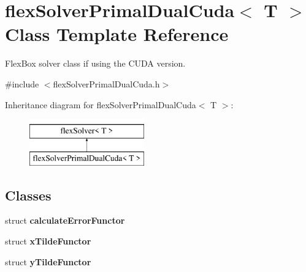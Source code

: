 \hypertarget{classflex_solver_primal_dual_cuda}{}\section{flex\+Solver\+Primal\+Dual\+Cuda$<$ T $>$ Class Template Reference}
\label{classflex_solver_primal_dual_cuda}


Flex\+Box solver class if using the C\+U\+DA version.  




{\ttfamily \#include $<$flex\+Solver\+Primal\+Dual\+Cuda.\+h$>$}

Inheritance diagram for flex\+Solver\+Primal\+Dual\+Cuda$<$ T $>$\+:\begin{figure}[H]
\begin{center}
\leavevmode
\includegraphics[height=2.000000cm]{classflex_solver_primal_dual_cuda}
\end{center}
\end{figure}
\subsection*{Classes}
\begin{DoxyCompactItemize}
\item 
struct {\bfseries calculate\+Error\+Functor}
\item 
struct {\bfseries x\+Tilde\+Functor}
\item 
struct {\bfseries y\+Tilde\+Functor}
\end{DoxyCompactItemize}

